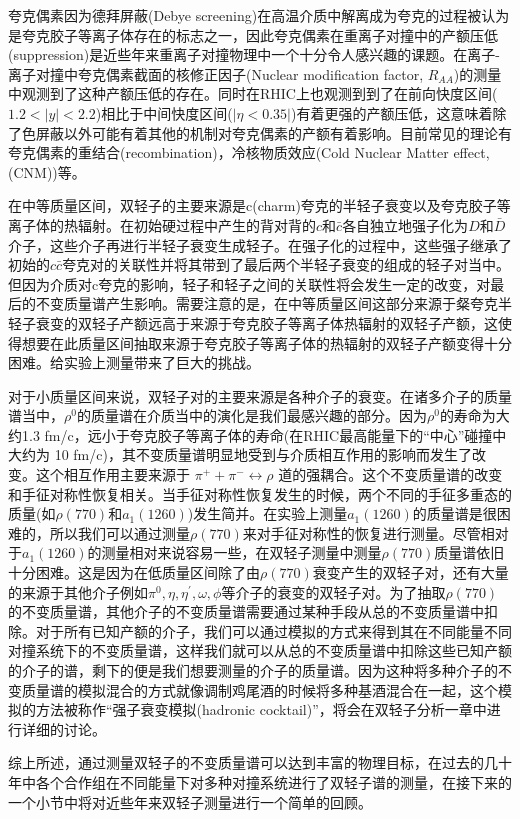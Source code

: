 夸克偶素因为德拜屏蔽(Debye screening)在高温介质中解离成为夸克的过程被认为是夸克胶子等离子体存在的标志之一，因此夸克偶素在重离子对撞中的产额压低(suppression)是近些年来重离子对撞物理中一个十分令人感兴趣的课题。在离子-离子对撞中夸克偶素截面的核修正因子(Nuclear modification factor, $R_{AA}$)的测量中观测到了这种产额压低的存在。同时在RHIC上也观测到到了在前向快度区间($1.2 < |y| < 2.2$)相比于中间快度区间($|\eta <0.35|$)有着更强的产额压低，这意味着除了色屏蔽以外可能有着其他的机制对夸克偶素的产额有着影响。目前常见的理论有夸克偶素的重结合(recombination)，冷核物质效应(Cold Nuclear Matter effect, (CNM))等。

在中等质量区间，双轻子的主要来源是c(charm)夸克的半轻子衰变以及夸克胶子等离子体的热辐射。在初始硬过程中产生的背对背的$c$和$\bar{c}$各自独立地强子化为$D$和$\bar{D}$介子，这些介子再进行半轻子衰变生成轻子。在强子化的过程中，这些强子继承了初始的$c\bar{c}$夸克对的关联性并将其带到了最后两个半轻子衰变的组成的轻子对当中。但因为介质对c夸克的影响，轻子和轻子之间的关联性将会发生一定的改变，对最后的不变质量谱产生影响。需要注意的是，在中等质量区间这部分来源于粲夸克半轻子衰变的双轻子产额远高于来源于夸克胶子等离子体热辐射的双轻子产额，这使得想要在此质量区间抽取来源于夸克胶子等离子体的热辐射的双轻子产额变得十分困难。给实验上测量带来了巨大的挑战。

对于小质量区间来说，双轻子对的主要来源是各种介子的衰变。在诸多介子的质量谱当中，$\rho^0$的质量谱在介质当中的演化是我们最感兴趣的部分。因为$\rho^0$的寿命为大约1.3 fm/c，远小于夸克胶子等离子体的寿命(在RHIC最高能量下的“中心”碰撞中大约为 10 fm/c)，其不变质量谱明显地受到与介质相互作用的影响而发生了改变。这个相互作用主要来源于 $\pi^+ + \pi^- \leftrightarrow \rho$ 道的强耦合。这个不变质量谱的改变和手征对称性恢复相关。当手征对称性恢复发生的时候，两个不同的手征多重态的质量(如$\rho(770)$和$a_1(1260)$)发生简并。在实验上测量$a_1(1260)$的质量谱是很困难的，所以我们可以通过测量$\rho(770)$来对手征对称性的恢复进行测量。尽管相对于$a_1(1260)$的测量相对来说容易一些，在双轻子测量中测量$\rho(770)$质量谱依旧十分困难。这是因为在低质量区间除了由$\rho(770)$衰变产生的双轻子对，还有大量的来源于其他介子例如$\pi^0, \eta, \eta^\prime, \omega, \phi$等介子的衰变的双轻子对。为了抽取$\rho(770)$的不变质量谱，其他介子的不变质量谱需要通过某种手段从总的不变质量谱中扣除。对于所有已知产额的介子，我们可以通过模拟的方式来得到其在不同能量不同对撞系统下的不变质量谱，这样我们就可以从总的不变质量谱中扣除这些已知产额的介子的谱，剩下的便是我们想要测量的介子的质量谱。因为这种将多种介子的不变质量谱的模拟混合的方式就像调制鸡尾酒的时候将多种基酒混合在一起，这个模拟的方法被称作“强子衰变模拟(hadronic cocktail)”，将会在双轻子分析一章中进行详细的讨论。

综上所述，通过测量双轻子的不变质量谱可以达到丰富的物理目标，在过去的几十年中各个合作组在不同能量下对多种对撞系统进行了双轻子谱的测量，在接下来的一个小节中将对近些年来双轻子测量进行一个简单的回顾。